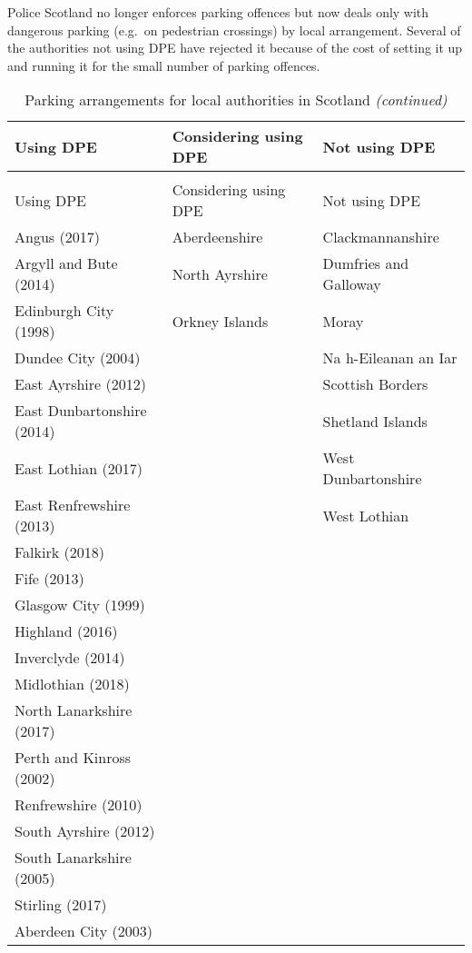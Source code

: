 \documentclass[
  12pt,
]{article}
\begin{document}
Police Scotland no longer enforces parking offences but now deals only with dangerous parking (e.g.~on pedestrian crossings) by local arrangement. Several of the authorities not using DPE have rejected it because of the cost of setting it up and running it for the small number of parking offences.

\begingroup\fontsize{10}{12}\selectfont

\begin{longtable}[t]{lll}
\caption{\label{tab:dpe}Parking arrangements for local authorities in Scotland}\\
\toprule
Using DPE & Considering using DPE & Not using DPE\\
\midrule
\endfirsthead
\caption[]{\label{tab:dpe}Parking arrangements for local authorities in Scotland \textit{(continued)}}\\
\toprule
Using DPE & Considering using DPE & Not using DPE\\
\midrule
\endhead

\endfoot
\bottomrule
\endlastfoot
Angus (2017) & Aberdeenshire & Clackmannanshire\\
Argyll and Bute (2014) & North Ayrshire & Dumfries and Galloway\\
Edinburgh City (1998) & Orkney Islands & Moray\\
Dundee City (2004) &  & Na h-Eileanan an Iar\\
East Ayrshire (2012) &  & Scottish Borders\\
East Dunbartonshire (2014) &  & Shetland Islands\\
East Lothian (2017) &  & West Dunbartonshire\\
East Renfrewshire (2013) &  & West Lothian\\
Falkirk (2018) &  & \\
Fife (2013) &  & \\
Glasgow City (1999) &  & \\
Highland (2016) &  & \\
Inverclyde (2014) &  & \\
Midlothian (2018) &  & \\
North Lanarkshire (2017) &  & \\
Perth and Kinross (2002) &  & \\
Renfrewshire (2010) &  & \\
South Ayrshire (2012) &  & \\
South Lanarkshire (2005) &  & \\
Stirling (2017) &  & \\
Aberdeen City (2003) &  & \\*
\end{longtable}
\endgroup{}
\end{document}
